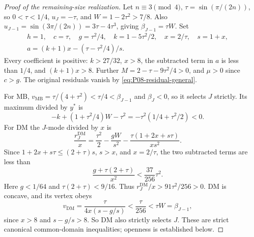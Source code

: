 \documentclass[11pt]{article}
\newcommand{\DM}{\mathrm{DM}}
\newcommand{\MB}{\mathrm{MB}}
\theoremstyle{definition}
\theoremstyle{remark}
\begin{document}
\begin{proof}[Proof of the remaining-size realization]
Let $n\equiv3\pmod4$, $\tau=\sin(\pi/(2n))$, so $0<\tau<1/4$,
$u_J=-\tau$, and $W=1-2\tau^2>7/8$.
Also $u_{J-1}=\sin(3\pi/(2n))=3\tau-4\tau^3$, giving
$\beta_{J-1}=\tau W$. Set
\begin{equation}
\begin{gathered}
 h=1,\quad c=\tau,\quad g=\tau^2/4,\quad
 k=1-5\tau^2/2,\quad x=2/\tau,\quad s=1+x,\\
 a=(k+1)x-(\tau-\tau^2/4)/s.
\end{gathered}\label{eq:P08-reverse-family}
\end{equation}
Every coefficient is positive: $k>27/32$, $x>8$, the subtracted
term in $a$ is less than $1/4$, and $(k+1)x>8$.
Further $M=2-\tau-9\tau^2/4>0$, and $\mu>0$ since $c>g$.
The original residuals vanish by \eqref{eq:P08-residual-general}.

For MB, $v_{\MB}=\tau/(4+\tau^2)<\tau/4<\beta_{J-1}$ and
$\beta_J<0$, so it selects $J$ strictly. Its maximum divided by $y^*$ is
\[
 -k+(1+\tau^2/4)W-\tau^2=-\tau^2(1/4+\tau^2/2)<0.
\]
For DM the $J$-mode divided by $x$ is
\[
 \frac{r_J^{\DM}}x=\frac{\tau^2}{2}-\frac{gW}{s^2}
              -\frac{\tau(1+2x+s\tau)}{xs^2}.
\]
Since $1+2x+s\tau\le(2+\tau)s$, $s>x$, and $x=2/\tau$,
the two subtracted terms are less than
\[
 \frac{g+\tau(2+\tau)}{x^2}<\frac{37}{256}\tau^2.
\]
Here $g<1/64$ and $\tau(2+\tau)<9/16$. Thus
$r_J^{\DM}/x>91\tau^2/256>0$.
DM is concave, and its vertex obeys
\[
 v_{\DM}=\frac{\tau}{4x(s-g/s)}<\frac{\tau}{256}
      <\tau W=\beta_{J-1},
\]
since $x>8$ and $s-g/s>8$. So DM also strictly selects $J$.
These are strict canonical common-domain inequalities; openness is
established below.
\end{proof}
\end{document}
